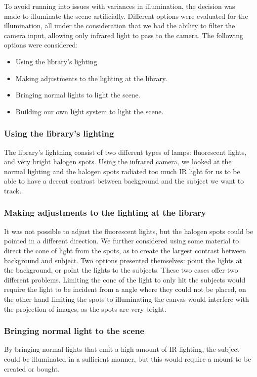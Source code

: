 To avoid running into issues with variances in illumination, the decision was made to illuminate the scene artificially. Different options were evaluated for the illumination, all under the consideration that we had the ability to filter the camera input, allowing only infrared light to pass to the camera. The following options were considered:

\begin{itemize}
\item Using the library's lighting.
\item Making adjustments to the lighting at the library.
\item Bringing normal lights to light the scene.
\item Building our own light system to light the scene.
\end{itemize}

\subsubsection{Using the library's lighting}
The library's lightning consist of two different types of lamps: fluorescent lights, and very bright halogen spots. Using the infrared camera, we looked at the normal lighting and the halogen spots radiated too much IR light for us to be able to have a decent contrast between background and the subject we want to track.

\subsubsection{Making adjustments to the lighting at the library}
It was not possible to adjust the fluorescent lights, but the halogen spots could be pointed in a different direction. We further considered using some material to direct the cone of light from the spots, as to create the largest contrast between background and subject. Two options presented themselves: point the lights at the background, or point the lights to the subjects. These two cases offer two different problems. Limiting the cone of the light to only hit the subjects would require the light to be incident from a angle where they could not be placed, on the other hand limiting the spots to illuminating the canvas would interfere with the projection of images, as the spots are very bright.

\subsubsection{Bringing normal light to the scene} 
By bringing normal lights that emit a high amount of IR lighting, the subject could be illuminated in a sufficient manner, but this would require a mount to be created or bought.

